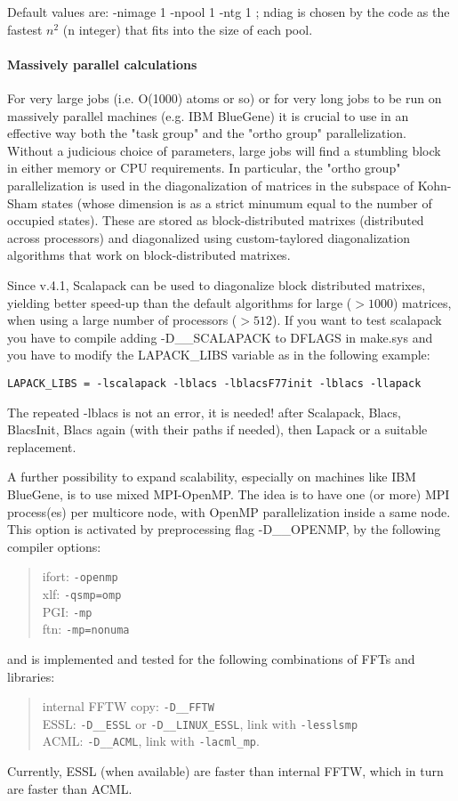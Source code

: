 \documentclass[12pt,a4paper]{article}
\begin{document}
Default values are: -nimage 1 -npool 1 -ntg 1 ; ndiag is chosen
by the code as the fastest $n^2$ (n integer) that fits into the size
of each pool.

\paragraph{Massively parallel calculations}
For very large jobs (i.e. O(1000) atoms or so) or for very long jobs
to be run on massively parallel  machines (e.g. IBM BlueGene) it is
crucial to use in an effective way both the "task group" and the
"ortho group" parallelization. Without a judicious choice of
parameters, large jobs will find a stumbling block in either memory or 
CPU requirements. In particular, the "ortho group" parallelization is
used in the diagonalization  of matrices in the subspace of Kohn-Sham
states (whose dimension is as a strict minumum equal to the number of
occupied states). These are stored as block-distributed matrixes
(distributed across processors) and diagonalized using custom-taylored
diagonalization algorithms that work on block-distributed matrixes.

Since v.4.1, Scalapack can be used to diagonalize block distributed
matrixes, yielding better speed-up than the default algorithms for
large ($ > 1000$) matrices, when using a large number of processors 
($> 512$). If you want to test scalapack  you have to compile adding
-D\_\_SCALAPACK to DFLAGS in make.sys and you have to  
modify the LAPACK\_LIBS variable as in the following example:
\begin{verbatim}
LAPACK_LIBS = -lscalapack -lblacs -lblacsF77init -lblacs -llapack
\end{verbatim}
The repeated -lblacs is not an error, it is needed! after Scalapack,
Blacs, BlacsInit, Blacs again (with their paths if needed), then
Lapack or a suitable replacement.

A further possibility to expand scalability, especially on machines
like IBM BlueGene, is to use mixed MPI-OpenMP. The idea is to have
one (or more) MPI process(es) per multicore node, with OpenMP
parallelization inside a same node. This option is activated by 
preprocessing flag -D\_\_OPENMP, by the following compiler options:
\begin{quote}
 ifort: \texttt{-openmp}\\
 xlf:   \texttt{-qsmp=omp}\\
 PGI:   \texttt{-mp}\\
 ftn:   \texttt{-mp=nonuma}
\end{quote}
and is implemented and tested for the following combinations of FFTs
and libraries:
\begin{quote}
 internal FFTW copy: \texttt{-D\_\_FFTW}\\
 ESSL: \texttt{-D\_\_ESSL} or \texttt{-D\_\_LINUX\_ESSL}, link 
 with \texttt{-lesslsmp}\\
 ACML: \texttt{-D\_\_ACML}, link with \texttt{-lacml\_mp}.
\end{quote}
Currently, ESSL (when available) are faster than internal FFTW,
which in turn are faster than ACML.
\end{document}
